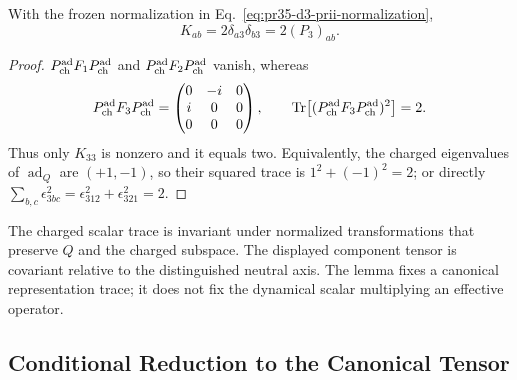 \begin{lemma}
\label{lem:pr35-d3-adjoint-trace}
With the frozen normalization in Eq.~\eqref{eq:pr35-d3-prii-normalization},
\begin{equation}
 K_{ab}=2\delta_{a3}\delta_{b3}=2(P_3)_{ab}.
 \label{eq:pr35-d3-k-equals-two-p3}
\end{equation}
\end{lemma}

\begin{proof}
$P_{\rm ch}^{\rm ad}F_1P_{\rm ch}^{\rm ad}$ and
$P_{\rm ch}^{\rm ad}F_2P_{\rm ch}^{\rm ad}$ vanish, whereas
\begin{equation}
 P_{\rm ch}^{\rm ad}F_3P_{\rm ch}^{\rm ad}
 =\begin{pmatrix}0&-i&0\\i&0&0\\0&0&0\end{pmatrix},
 \qquad
 \operatorname{Tr}\!\left[
 (P_{\rm ch}^{\rm ad}F_3P_{\rm ch}^{\rm ad})^2\right]=2.
\end{equation}
Thus only $K_{33}$ is nonzero and it equals two.  Equivalently, the charged
eigenvalues of $\operatorname{ad}_Q$ are $(+1,-1)$, so their squared trace is
$1^2+(-1)^2=2$; or directly
$\sum_{b,c}\epsilon_{3bc}^2=\epsilon_{312}^2+\epsilon_{321}^2=2$.
\end{proof}

The charged scalar trace is invariant under normalized transformations that
preserve $Q$ and the charged subspace.  The displayed component tensor is
covariant relative to the distinguished neutral axis.  The lemma fixes a
canonical representation trace; it does not fix the dynamical scalar
multiplying an effective operator.

\subsection{Conditional Reduction to the Canonical Tensor}

